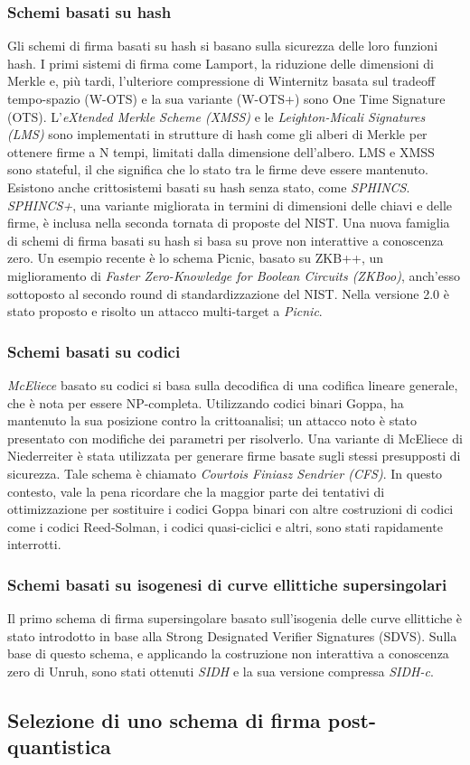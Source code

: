 \subsubsection{Schemi basati su hash}
Gli schemi di firma basati su hash si basano sulla sicurezza delle loro funzioni hash. I primi sistemi di firma come Lamport, la riduzione delle dimensioni di Merkle e, più tardi, l'ulteriore compressione di Winternitz basata sul tradeoff tempo-spazio (W-OTS) e la sua variante (W-OTS+) sono One Time Signature (OTS). L'\textit{eXtended Merkle Scheme (XMSS)} e le \textit{Leighton-Micali Signatures (LMS)} sono implementati in strutture di hash come gli alberi di Merkle per ottenere firme a N tempi, limitati dalla dimensione dell'albero. LMS e XMSS sono stateful, il che significa che lo stato tra le firme deve essere mantenuto. Esistono anche crittosistemi basati su hash senza stato, come \textit{SPHINCS}. \textit{SPHINCS+}, una variante migliorata in termini di dimensioni delle chiavi e delle firme, è inclusa nella seconda tornata di proposte del NIST. Una nuova famiglia di schemi di firma basati su hash si basa su prove non interattive a conoscenza zero. Un esempio recente è lo schema Picnic, basato su ZKB++, un miglioramento di \textit{Faster Zero-Knowledge for Boolean Circuits (ZKBoo)}, anch'esso sottoposto al secondo round di standardizzazione del NIST. Nella versione 2.0 è stato proposto e risolto un attacco multi-target a \textit{Picnic}.

\subsubsection{Schemi basati su codici}
\textit{McEliece} basato su codici si basa sulla decodifica di una codifica lineare generale, che è nota per essere NP-completa. Utilizzando codici binari Goppa, ha mantenuto la sua posizione contro la crittoanalisi; un attacco noto è stato presentato con modifiche dei parametri per risolverlo. Una variante di McEliece di Niederreiter è stata utilizzata per generare firme basate sugli stessi presupposti di sicurezza. Tale schema è chiamato \textit{Courtois Finiasz Sendrier (CFS)}. In questo contesto, vale la pena ricordare che la maggior parte dei tentativi di ottimizzazione per sostituire i codici Goppa binari con altre costruzioni di codici come i codici Reed-Solman, i codici quasi-ciclici e altri, sono stati rapidamente interrotti.

\subsubsection{Schemi basati su isogenesi di curve ellittiche supersingolari}
Il primo schema di firma supersingolare basato sull'isogenia delle curve ellittiche è stato introdotto in base alla Strong Designated Verifier Signatures (SDVS). Sulla base di questo schema, e applicando la costruzione non interattiva a conoscenza zero di Unruh, sono stati ottenuti \textit{SIDH} e la sua versione compressa \textit{SIDH-c}.

\subsection{Selezione di uno schema di firma post-quantistica}